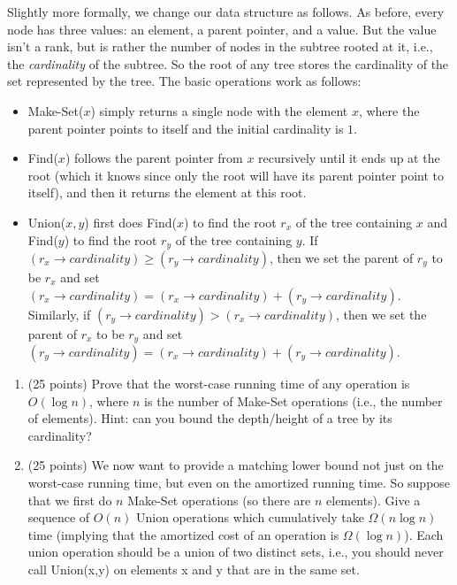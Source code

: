 \documentclass[11pt]{article}
\begin{document}
Slightly more formally, we change our data structure as follows.  As before, every node has three values: an element, a parent pointer, and a value.  But the value isn't a rank, but is rather the number of nodes in the subtree rooted at it, i.e., the \emph{cardinality} of the subtree.  So the root of any tree stores the cardinality of the set represented by the tree. The basic operations work as follows:

\begin{itemize}
\item Make-Set($x$) simply returns a single node with the element $x$, where the parent pointer points to itself and the initial cardinality is $1$.

\item Find($x$) follows the parent pointer from $x$ recursively until it ends up at the root (which it knows since only the root will have its parent pointer point to itself), and then it returns the element at this root.

\item Union($x,y$) first does Find($x$) to find the root $r_x$ of the tree containing $x$ and Find($y$) to find the root $r_y$ of the tree containing $y$.  If $(r_x \rightarrow cardinality) \geq (r_y \rightarrow cardinality)$, then we set the parent of $r_y$ to be $r_x$ and set $(r_x \rightarrow cardinality) = (r_x \rightarrow cardinality) + (r_y \rightarrow cardinality)$.  Similarly, if $(r_y \rightarrow cardinality) > (r_x \rightarrow cardinality)$, then we set the parent of $r_x$ to be $r_y$ and set $(r_y \rightarrow cardinality) = (r_x \rightarrow cardinality) + (r_y \rightarrow cardinality)$.
\end{itemize}

\begin{enumerate}
\item (25 points) Prove that the worst-case running time of any operation is $O(\log n)$, where $n$ is the number of Make-Set operations (i.e., the number of elements).  Hint: can you bound the depth/height of a tree by its cardinality?

\item (25 points) We now want to provide a matching lower bound not just on the worst-case running time, but even on the amortized running time.  So suppose that we first do $n$ Make-Set operations (so there are $n$ elements).  Give a sequence of $O(n)$ Union operations which cumulatively take $\Omega(n \log n)$ time (implying that the amortized cost of an operation is $\Omega(\log n)$).  Each union operation should be a union of two distinct sets, i.e., you should never call Union(x,y) on elements x and y that are in the same set.

\end{enumerate}
\end{document}
